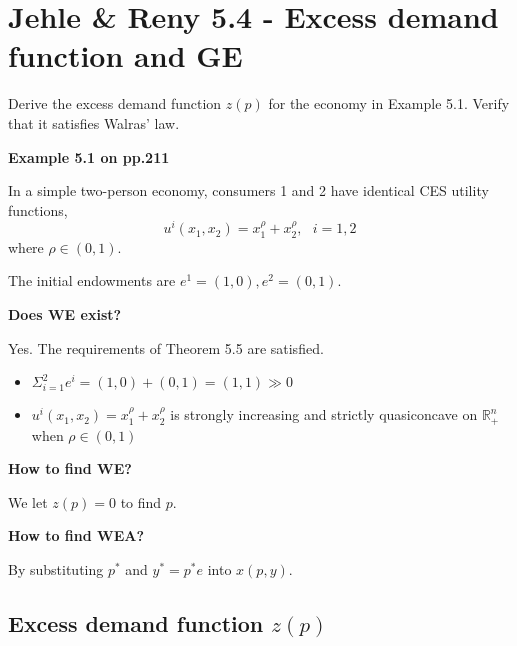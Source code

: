 \documentclass{article}
\newcommand{\R}{\mathbb{R}}
\begin{document}
\section{Jehle \& Reny 5.4 - Excess demand function and GE}

Derive the excess demand function $z(p)$ for the economy in Example 5.1. Verify that it satisfies
Walras' law.

\begin{mdframed}[backgroundcolor=blue!20,linecolor=white]
\textbf{Example 5.1 on pp.211}

In a simple two-person economy, consumers 1 and 2 have identical CES utility functions,
$$u^i(x_1,x_2) = x^\rho_1 + x^\rho_2, \ \ \ i= 1,2$$
where $\rho \in (0,1)$.

The initial endowments are $e^1 = (1,0), e^2 = (0,1)$.

\vspace{2mm}

\textbf{Does WE exist?}

Yes. The requirements of Theorem 5.5 are satisfied.

\begin{itemize}
\item $\Sigma_{i=1}^{2} e^i = (1,0) + (0,1) = (1,1) \gg 0$
\item $u^i(x_1,x_2) = x^\rho_1 + x^\rho_2$ is strongly increasing and strictly quasiconcave on $\R^n_{+}$ when $\rho \in (0,1)$
\end{itemize}


\textbf{How to find WE? }

We let $z(p)=0$ to find $p$.

\vspace{2mm}

\textbf{How to find WEA? }

By substituting $p^*$ and $y^* = p^*e$ into $x(p,y)$.








\end{mdframed}

\subsection{Excess demand function $z(p)$}
\end{document}
